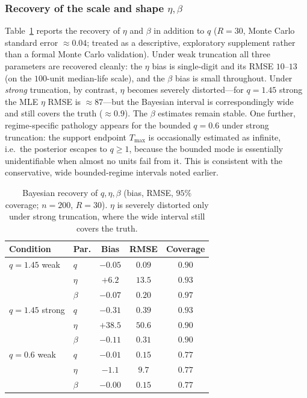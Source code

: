 \documentclass[ASNA,twocolumn]{USG}
\begin{document}
\subsubsection{Recovery of the scale and shape $\eta,\beta$}\label{sec:etasupp}
Table~\ref{tab:etasupp} reports the recovery of $\eta$ and $\beta$ in
addition to $q$ ($R=30$, Monte Carlo standard error $\approx0.04$; treated
as a descriptive, exploratory supplement rather than a formal Monte Carlo
validation). Under
weak truncation all three parameters are recovered cleanly: the $\eta$
bias is single-digit and its RMSE $10$--$13$ (on the $100$-unit median-life
scale), and the $\beta$ bias is small throughout. Under \emph{strong}
truncation, by contrast, $\eta$ becomes severely distorted---for
$q=1.45$ strong the MLE $\eta$ RMSE is $\approx87$---but the Bayesian
interval is correspondingly wide and still covers the truth
($\approx0.9$). The $\beta$ estimates remain stable. One further,
regime-specific pathology appears for the bounded $q=0.6$ under strong
truncation: the support endpoint $T_{\max}$ is occasionally estimated as
infinite, i.e.\ the posterior escapes to $q\ge1$, because the bounded mode
is essentially unidentifiable when almost no units fail from it. This is
consistent with the conservative, wide bounded-regime intervals noted
earlier.

\begin{table}[h]
\centering
\caption{Bayesian recovery of $q,\eta,\beta$ (bias, RMSE, $95\%$
coverage; $n=200$, $R=30$). $\eta$ is severely distorted only under strong
truncation, where the wide interval still covers the truth.}
\label{tab:etasupp}
\small
\begin{tabular}{llccc}
\toprule
Condition & Par. & Bias & RMSE & Coverage\\
\midrule
$q=1.45$ weak  & $q$    & $-0.05$ & $0.09$ & $0.90$\\
               & $\eta$ & $+6.2$  & $13.5$ & $0.93$\\
               & $\beta$& $-0.07$ & $0.20$ & $0.97$\\
$q=1.45$ strong& $q$    & $-0.31$ & $0.39$ & $0.93$\\
               & $\eta$ & $+38.5$ & $50.6$ & $0.90$\\
               & $\beta$& $-0.11$ & $0.31$ & $0.90$\\
$q=0.6$ weak   & $q$    & $-0.01$ & $0.15$ & $0.77$\\
               & $\eta$ & $-1.1$  & $9.7$  & $0.77$\\
               & $\beta$& $-0.00$ & $0.15$ & $0.77$\\
\bottomrule
\end{tabular}
\end{table}
\end{document}

